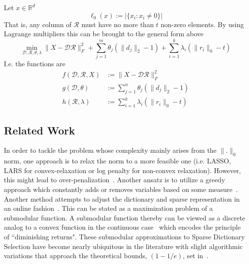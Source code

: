 \documentclass{article}
\newcommand{\R}{\mathbb{R}}
\newcommand{\Rr}{\mathcal{R}}
\newcommand{\D}{\mathcal{D}}
\begin{document}
\qquad\qquad\qquad\qquad Let $x \in \R^d$
\[
\ell_0(x) := \big|\{x_i : x_i \not= 0\}\big|
\]That is, any column of $\Rr$ must have no more than $t$ non-zero elements. By using Lagrange multipliers this can be brought to the general form above
\[
\min_{\D, \Rr, \theta, \lambda} \|X  -\D\Rr\|_F^2 + \sum_{j=1}^m \theta_j (\| d_j\|_2 - 1)+ \sum_{i=1}^k \lambda_i (\| r_i \|_0 - t)
\]
I.e. the functions are
\[
\begin{split}
f(\D, \Rr, X) &:= \| X -\D \Rr \|_F^2 \\
g(\D, \theta) &:= \sum_{j=1}^n \theta_j (\| d_j\|_2 - 1) \\
h(\Rr, \lambda) &:= \sum_{i=1}^k \lambda_i (\| r_i \|_0 - t)
\end{split}
\]


\subsection{Related Work}\label{sec:prior-work}

In order to tackle the problem whose complexity mainly arises from the $\| .\|_0$ norm, one approach is to relax the norm to a more feasible one (i.e. LASSO, LARS for convex-relaxation or log penalty for non-convex relaxation). However, this might lead to over-penalization~\cite{nonconvexrelax}. Another ansatz is to utilize a greedy approach which constantly adds or removes variables based on some measure~\cite{submod_spectral}.  Another method attempts to adjust the dictionary and sparse representation in an online fashion~\cite{mairal09}. This can be stated as a maximization problem of a submodular function. A submodular function thereby can be viewed as a discrete analog to a convex function in the continuous case~\cite{submod_sparsecoding} which encodes the principle of ``diminishing returns". These submodular approximations to Sparse Dictionary Selection have become nearly ubiquitous in the literature with slight algorithmic variations that approach the theoretical bounds, $(1 - 1/e)$, set in~\cite{Krause05near-optimalnonmyopic}.
\\
\end{document}
